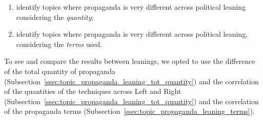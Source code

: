 \begin{enumerate}
    \item identify topics where propaganda is very different across political leaning considering the \emph{quantity};
    \item identify topics where propaganda is very different across political leaning, considering the \emph{terms} used.
\end{enumerate}

To see and compare the results between leanings, we opted to use the difference of the total quantity of propaganda (Subsection~\ref{ssec:topic_propaganda_leaning_tot_quantity}) and the correlation of the quantities of the techniques across Left and Right (Subsection~\ref{ssec:topic_propaganda_leaning_tot_quantity}) and the correlation of the propaganda terms (Subsection~\ref{ssec:topic_propaganda_leaning_terms}). 











